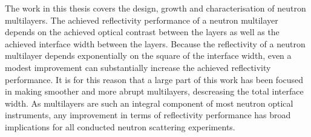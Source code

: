 The work in this thesis covers the design, growth and characterisation of neutron multilayers. The achieved reflectivity performance of a neutron multilayer depends on the achieved optical contrast between the layers as well as the achieved interface width between the layers. Because the reflectivity of a neutron multilayer depends exponentially on the square of the interface width, even a modest improvement can substantially increase the achieved reflectivity performance. It is for this reason that a large part of this work has been focused in making smoother and more abrupt multilayers, descreasing the total interface width. As multilayers are such an integral component of most neutron optical instruments, any improvement in terms of reflectivity performance has broad implications for all conducted neutron scattering experiments. \\
\\
